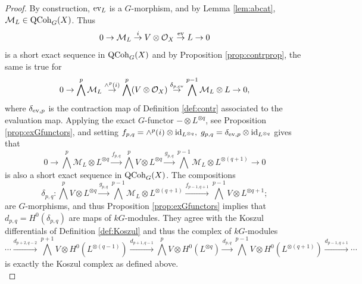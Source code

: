 \documentclass[10pt]{amsart}
\theoremstyle{definition}
\begin{document}
\begin{proof}
By construction, ${\rm ev}_L$ is a $G$-morphism, and by Lemma \ref{lem:abcat}, $\mathcal{M}_L\in{\rm QCoh}_G(X)$. Thus
\[
0\rightarrow \mathcal{M}_L\overset{i}{\rightarrow} V\otimes \mathcal{O}_X\overset{{\rm ev}}{\rightarrow} L\rightarrow 0
\]
is a short exact sequence in ${\rm QCoh}_G(X)$ and by Proposition \ref{prop:contrprop}, the same is true for
\[
0\rightarrow 
\bigwedge^p\mathcal{M}_L
\overset{\wedge^p(i)}{\rightarrow}
\bigwedge^p(V\otimes \mathcal{O}_X)
\overset{\delta_{p,{\rm ev}}}{\rightarrow}\bigwedge^{p-1} \mathcal{M}_L \otimes L\rightarrow 0,
\]
where $\delta_{{\rm ev},p}$ is the contraction map of Definition \ref{def:contr} associated to the evaluation map. Applying the exact $G$-functor $-\otimes L^{\otimes q}$, see Proposition \ref{prop:exGfunctors}, and setting $f_{p,q}=\wedge^p(i)\otimes{\rm id}_{L^{\otimes q}},\;g_{p,q}=\delta_{{\rm ev},p}\otimes {\rm id}_{L^{\otimes q}}$ gives that
\[
0\rightarrow 
\bigwedge^{p}\mathcal{M}_L\otimes L^{\otimes q}
\overset{f_{p,q}}{\longrightarrow}
\bigwedge^{p}V\otimes L^{\otimes q}
\overset{g_{p,q}}{\longrightarrow}
\bigwedge^{p-1}\mathcal{M}_L\otimes L^{\otimes (q+1)}
\rightarrow 0
 \tag{*}\label{eq:ses1}
\]
is also a short exact sequence in ${\rm QCoh}_G(X)$. The compositions
\[
\delta_{p,q}:
\bigwedge^{p}V\otimes L^{\otimes q}
\overset{ g_{p,q}}{\longrightarrow} 
\bigwedge^{p-1}\mathcal{M}_L\otimes L^{\otimes (q+1)}
\overset{f_{p-1,q+1}}{\longrightarrow}
\bigwedge^{p-1}V\otimes L^{\otimes q+1};
\]
are $G$-morphisms, and thus Proposition \ref{prop:exGfunctors} implies that $d_{p,q}=H^0(\delta_{p,q})$ are maps of $kG$-modules. They agree with the Koszul differentials of Definition \ref{def:Koszul} and thus the complex of $kG$-modules
\[
\cdots
\overset{d_{p+2,q-2}}{\longrightarrow} 
\bigwedge^{p+1}V\otimes H^0(L^{\otimes (q-1)})
\overset{d_{p+1,q-1}}{\longrightarrow} 
\bigwedge^{p}V\otimes H^0(L^{\otimes q})\overset{d_{p,q}}{\longrightarrow} 
\bigwedge^{p-1}V\otimes H^0(L^{\otimes (q+1)})\overset{d_{p-1,q+1}}{\longrightarrow}\cdots
\]
is exactly the Koszul complex as defined above.\\


\end{proof}
\end{document}
